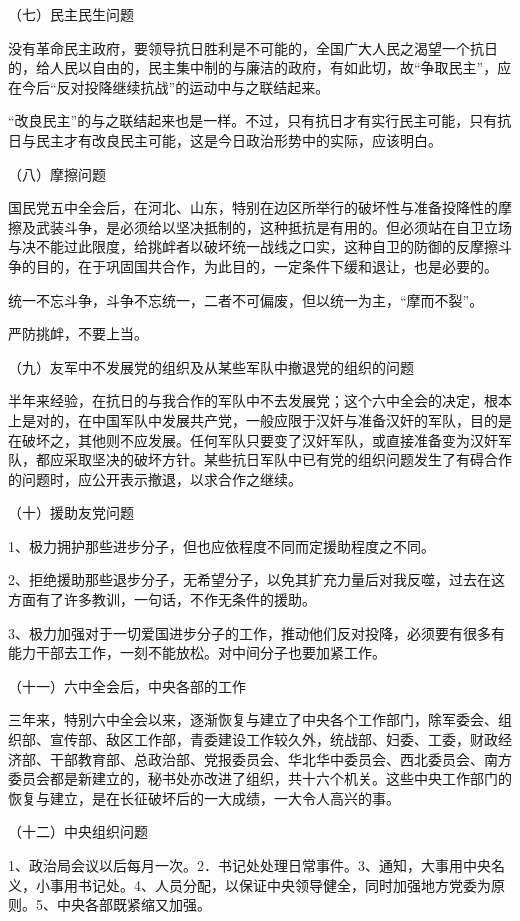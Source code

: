 （七）民主民生问题

没有革命民主政府，要领导抗日胜利是不可能的，全国广大人民之渴望一个抗日的，给人民以自由的，民主集中制的与廉洁的政府，有如此切，故“争取民主”，应在今后“反对投降继续抗战”的运动中与之联结起来。

“改良民主”的与之联结起来也是一样。不过，只有抗日才有实行民主可能，只有抗日与民主才有改良民主可能，这是今日政治形势中的实际，应该明白。

（八）摩擦问题

国民党五中全会后，在河北、山东，特别在边区所举行的破坏性与准备投降性的摩擦及武装斗争，是必须给以坚决抵制的，这种抵抗是有用的。但必须站在自卫立场与决不能过此限度，给挑衅者以破坏统一战线之口实，这种自卫的防御的反摩擦斗争的目的，在于巩固国共合作，为此目的，一定条件下缓和退让，也是必要的。

统一不忘斗争，斗争不忘统一，二者不可偏废，但以统一为主，“摩而不裂”。

严防挑衅，不要上当。

（九）友军中不发展党的组织及从某些军队中撤退党的组织的问题

半年来经验，在抗日的与我合作的军队中不去发展党；这个六中全会的决定，根本上是对的，在中国军队中发展共产党，一般应限于汉奸与准备汉奸的军队，目的是在破坏之，其他则不应发展。任何军队只要变了汉奸军队，或直接准备变为汉奸军队，都应采取坚决的破坏方针。某些抗日军队中已有党的组织问题发生了有碍合作的问题时，应公开表示撤退，以求合作之继续。

（十）援助友党问题

1、极力拥护那些进步分子，但也应依程度不同而定援助程度之不同。

2、拒绝援助那些退步分子，无希望分子，以免其扩充力量后对我反噬，过去在这方面有了许多教训，一句话，不作无条件的援助。

3、极力加强对于一切爱国进步分子的工作，推动他们反对投降，必须要有很多有能力干部去工作，一刻不能放松。对中间分子也要加紧工作。


（十一）六中全会后，中央各部的工作

三年来，特别六中全会以来，逐渐恢复与建立了中央各个工作部门，除军委会、组织部、宣传部、敌区工作部，青委建设工作较久外，统战部、妇委、工委，财政经济部、干部教育部、总政治部、党报委员会、华北华中委员会、西北委员会、南方委员会都是新建立的，秘书处亦改进了组织，共十六个机关。这些中央工作部门的恢复与建立，是在长征破坏后的一大成绩，一大令人高兴的事。

（十二）中央组织问题

1、政治局会议以后每月一次。2．书记处处理日常事件。3、通知，大事用中央名义，小事用书记处。4、人员分配，以保证中央领导健全，同时加强地方党委为原则。5、中央各部既紧缩又加强。

